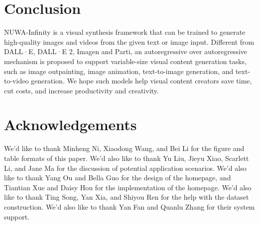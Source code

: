 \documentclass{article}
\begin{document}
\section{Conclusion}
NUWA-Infinity is a visual synthesis framework that can be trained to generate high-quality images and videos from the given text or image input. Different from DALL·E, DALL·E 2, Imagen and Parti, an autoregressive over autoregressive mechanism is proposed to support variable-size visual content generation tasks, such as image outpainting, image animation, text-to-image generation, and text-to-video generation. We hope such models help visual content creators save time, cut costs, and increase productivity and creativity.


\section*{Acknowledgements}

We'd like to thank Minheng Ni, Xiaodong Wang, and Bei Li for the figure and table formats of this paper. We'd also like to thank Yu Liu, Jieyu Xiao, Scarlett Li, and Jane Ma for the discussion of potential application scenarios. We'd also like to thank Yang Ou and Bella Guo for the design of the homepage, and Tiantian Xue and Daisy Hou for the implementation of the homepage. We'd also like to thank Ting Song, Yan Xia, and Shiyou Ren for the help with the dataset construction. We'd also like to thank Yan Fan and Quanlu Zhang for their system support.


































\end{document}
